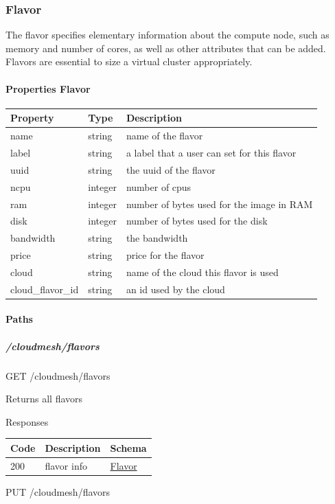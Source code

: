 \documentclass[9pt,]{article}
\let\oldparagraph\paragraph
\renewcommand{\paragraph}[1]{\oldparagraph{#1}\mbox{}}
\let\oldsubparagraph\subparagraph
\renewcommand{\subparagraph}[1]{\oldsubparagraph{#1}\mbox{}}
\begin{document}
\hypertarget{flavor}{%
\subsubsection{Flavor}\label{flavor}}

The flavor specifies elementary information about the compute node, such
as memory and number of cores, as well as other attributes that can be
added. Flavors are essential to size a virtual cluster appropriately.

\hypertarget{properties-flavor}{%
\paragraph{Properties Flavor}\label{properties-flavor}}

\begin{longtable}[]{@{}lll@{}}
\toprule
Property & Type & Description\tabularnewline
\midrule
\endhead
name & string & name of the flavor\tabularnewline
label & string & a label that a user can set for this
flavor\tabularnewline
uuid & string & the uuid of the flavor\tabularnewline
ncpu & integer & number of cpus\tabularnewline
ram & integer & number of bytes used for the image in RAM\tabularnewline
disk & integer & number of bytes used for the disk\tabularnewline
bandwidth & string & the bandwidth\tabularnewline
price & string & price for the flavor\tabularnewline
cloud & string & name of the cloud this flavor is used\tabularnewline
cloud\_flavor\_id & string & an id used by the cloud\tabularnewline
\bottomrule
\end{longtable}

\hypertarget{paths-14}{%
\paragraph{Paths}\label{paths-14}}

\hypertarget{cloudmeshflavors}{%
\subparagraph{/cloudmesh/flavors}\label{cloudmeshflavors}}

GET /cloudmesh/flavors

Returns all flavors

Responses

\begin{longtable}[]{@{}lll@{}}
\toprule
Code & Description & Schema\tabularnewline
\midrule
\endhead
200 & flavor info & \protect\hyperlink{flavor}{Flavor}\tabularnewline
\bottomrule
\end{longtable}

PUT /cloudmesh/flavors
\end{document}
